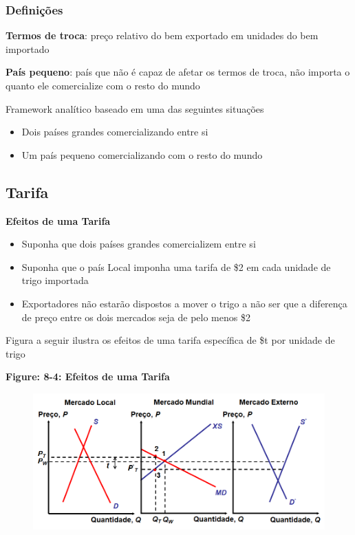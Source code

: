 \documentclass[a4paper,12pt]{article}[abntex2]
\begin{document}
\subsubsection{\textbf{Definições}}
\textbf{Termos de troca}: preço relativo do bem exportado em unidades do bem importado

\textbf{País pequeno}: país que não é capaz de afetar os termos de troca, não importa o quanto ele comercialize com o resto do mundo

Framework analítico baseado em uma das seguintes situações
\begin{itemize}
  \item Dois países grandes comercializando entre si
  \item Um país pequeno comercializando com o resto do mundo
\end{itemize}

\subsection{\textbf{Tarifa}}
\textbf{Efeitos de uma Tarifa}\begin{itemize}
    \item Suponha que dois países grandes comercializem entre si

    \item Suponha que o país Local imponha uma tarifa de \$2 em cada unidade de trigo importada

    \item Exportadores não estarão dispostos a mover o trigo a não ser que a diferença de preço entre os dois mercados seja de pelo menos \$2
\end{itemize}

Figura a seguir ilustra os efeitos de uma tarifa específica de \$t por unidade de trigo

\textbf{Figure: 8-4: Efeitos de uma Tarifa}

\begin{figure}[H]
    \centering
    \includegraphics[width=0.75\linewidth]{Imagens/a19i9.png}
\end{figure}
\end{document}
